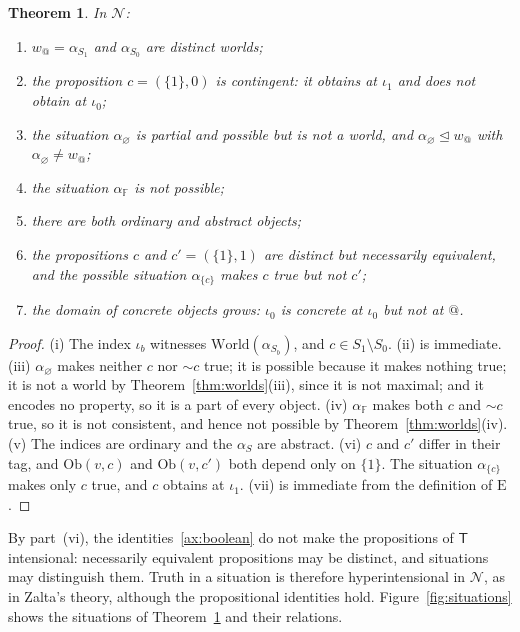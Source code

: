 \documentclass[11pt]{amsart}
\makeatletter
\theoremstyle{plain}
\newtheorem{theorem}{Theorem}[section]
\theoremstyle{definition}
\theoremstyle{remark}
\newcommand{\at}{@}
\newcommand{\aw}{w_{\at}}
\newcommand{\Obt}{\mathrm{Ob}}
\newcommand{\Conc}{\mathrm{E}}
\newcommand{\World}{\mathrm{World}}
\newcommand{\partof}{\trianglelefteq}
\newcommand{\Pty}{\mathbb{F}}
\newcommand{\T}{\mathsf{T}}
\newcommand{\N}{\mathcal{N}}
\newcommand{\pneg}{\mathord{\sim}}
\makeatother
\begin{document}
\begin{theorem}
\label{thm:nondegenerate}
In $\N$:
\begin{enumerate}[label=(\roman*)]
\item $\aw = \alpha_{S_1}$ and $\alpha_{S_0}$ are distinct worlds;
\item the proposition $c = (\{1\}, 0)$ is contingent: it obtains at
  $\iota_1$ and does not obtain at $\iota_0$;
\item the situation $\alpha_\varnothing$ is partial and possible but is
  not a world, and $\alpha_\varnothing \partof \aw$ with
  $\alpha_\varnothing \neq \aw$;
\item the situation $\alpha_{\Pty}$ is not possible;
\item there are both ordinary and abstract objects;
\item the propositions $c$ and $c' = (\{1\}, 1)$ are distinct but
  necessarily equivalent, and the possible situation $\alpha_{\{c\}}$
  makes $c$ true but not $c'$;
\item the domain of concrete objects grows: $\iota_0$ is concrete at
  $\iota_0$ but not at $\at$.
\end{enumerate}
\end{theorem}

\begin{proof}
(i) The index $\iota_b$ witnesses $\World(\alpha_{S_b})$, and
$c \in S_1 \setminus S_0$. (ii) is immediate.
(iii) $\alpha_\varnothing$ makes neither $c$ nor $\pneg c$ true; it is
possible because it makes nothing true; it is not a world by
Theorem~\ref{thm:worlds}(iii), since it is not maximal; and it encodes
no property, so it is a part of every object.
(iv) $\alpha_{\Pty}$ makes both $c$ and $\pneg c$ true, so it is not
consistent, and hence not possible by Theorem~\ref{thm:worlds}(iv).
(v) The indices are ordinary and the $\alpha_S$ are abstract.
(vi) $c$ and $c'$ differ in their tag, and $\Obt(v, c)$ and
$\Obt(v, c')$ both depend only on $\{1\}$. The situation
$\alpha_{\{c\}}$ makes only $c$ true, and $c$ obtains at $\iota_1$.
(vii) is immediate from the definition of $\Conc$.
\end{proof}

By part~(vi), the identities~\ref{ax:boolean} do not make the
propositions of $\T$ intensional: necessarily equivalent propositions
may be distinct, and situations may distinguish them. Truth in a
situation is therefore hyperintensional in $\N$, as in Zalta's theory,
although the propositional identities hold. Figure~\ref{fig:situations}
shows the situations of Theorem~\ref{thm:nondegenerate} and their
relations.
\end{document}

